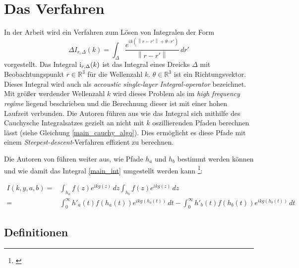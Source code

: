 \chapter{Das Verfahren}\label{algo}


In der Arbeit  wird ein Verfahren zum Lösen von Integralen der Form
\begin{equation}
    \label{main_int}
    \Delta
    I_{r,\Delta}(k) = \int_{\Delta}^{}  \frac{e^{ik(\left\lVert r-r'\right\rVert + \theta \cdot r')}}{\left\lVert r-r'\right\rVert} \,dr'
\end{equation}
vorgestellt. Das Integral ${\rm i}_{r,\Delta}(k)$ ist das Integral eines Dreicks $\Delta$ mit Beobachtungspunkt $r \in \mathbb{R}^3$ für die Wellenzahl $k$. $\theta \in \mathbb{R}^3$ ist ein Richtungsvektor.
Dieses Integral wird auch als \textit{accoustic single-layer Integral-operator} bezeichnet.
Mit größer werdender Wellenzahl $k$ wird dieses Problem als im \textit{high frequency regime} liegend beschrieben und die Berechnung dieser ist mit einer hohen Laufzeit verbunden.
Die Autoren führen aus wie das Integral sich mithilfe des Cauchysche Integralsatzes gezielt an nicht mit $k$ oszillierenden Pfaden berechnen lässt (siehe Gleichung \ref{main_cauchy_algo}).
Dies ermöglicht es diese Pfade mit einem \textit{Steepest-descent}-Verfahren effizient zu berechnen.

Die Autoren von \cite{gasperini:hal-03209144} führen weiter aus, wie Pfade $h_a$ und $h_b$ bestimmt werden können und
 wie damit das Integral \ref{main_int} umgestellt werden kann \footnote{\cite[Kaptiel 1, Gleichung 4]{gasperini:hal-03209144}}:

\begin{equation}
    \label{main_cauchy_algo}
    \begin{aligned}
        I(k,y,a,b) = & \int_{h_a}^{} f(z) e^{ikg(z)} \,dz  \int_{h_b}^{} f(z) e^{ikg(z)} \,dz \\
        = & \int_{0}^{\infty} h'_a(t)f(h_a(t))e^{ikg(h_a(t))} \,dt -\int_{0}^{\infty} h'_b(t)f(h_b(t))e^{ikg(h_b(t))} \,dt 
    \end{aligned}
\end{equation}

\section{Definitionen}


